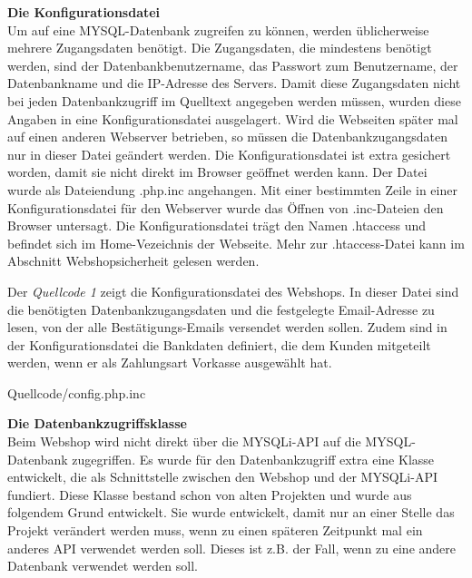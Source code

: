 \textbf{Die Konfigurationsdatei}\\
Um auf eine MYSQL-Datenbank zugreifen zu können, werden üblicherweise mehrere Zugangsdaten benötigt. Die Zugangsdaten, die mindestens benötigt werden, sind der Datenbankbenutzername, das Passwort zum Benutzername, der Datenbankname und die IP-Adresse des Servers. Damit diese Zugangsdaten nicht bei jeden Datenbankzugriff im Quelltext angegeben werden müssen, wurden diese Angaben in eine Konfigurationsdatei ausgelagert. Wird die Webseiten später mal auf einen anderen Webserver betrieben, so müssen die Datenbankzugangsdaten nur in dieser Datei geändert werden. Die Konfigurationsdatei ist extra gesichert worden, damit sie nicht direkt im Browser geöffnet werden kann. Der Datei wurde als Dateiendung \glqq *.php.inc\grqq{} angehangen. Mit einer bestimmten Zeile in einer Konfigurationsdatei für den Webserver wurde das Öffnen von \glqq *.inc\grqq{}-Dateien den Browser untersagt. Die Konfigurationsdatei trägt den Namen \glqq .htaccess\grqq{} und befindet sich im Home-Vezeichnis der Webseite. Mehr zur \glqq .htaccess\grqq{}-Datei kann im Abschnitt \glqq Webshopsicherheit\grqq{} gelesen werden.

Der \textit{Quellcode 1} zeigt die Konfigurationsdatei des Webshops. In dieser Datei sind die benötigten Datenbankzugangsdaten und die festgelegte Email-Adresse zu lesen, von der alle Bestätigungs-Emails versendet werden sollen. Zudem sind in der Konfigurationsdatei die Bankdaten definiert, die dem Kunden mitgeteilt werden, wenn er als Zahlungsart \glqq Vorkasse\grqq{} ausgewählt hat.
\newpage
\begin{center}
	\begin{lstinputlisting}[language=PHP, caption={Die Konfigurationsdatei}]
		{Quellcode/config.php.inc}
	\end{lstinputlisting}
\end{center}

\textbf{Die Datenbankzugriffsklasse}\\
Beim Webshop wird nicht direkt über die \glqq MYSQLi\grqq{}-API auf die MYSQL-Datenbank zugegriffen. Es wurde für den Datenbankzugriff extra eine Klasse entwickelt, die als Schnittstelle zwischen den Webshop und der \glqq MYSQLi\grqq{}-API fundiert. Diese Klasse bestand schon von alten Projekten und wurde aus folgendem Grund entwickelt. Sie wurde entwickelt, damit nur an einer Stelle das Projekt verändert werden muss, wenn zu einen späteren Zeitpunkt mal ein anderes API verwendet werden soll. Dieses ist z.B. der Fall, wenn zu eine andere Datenbank verwendet werden soll.


